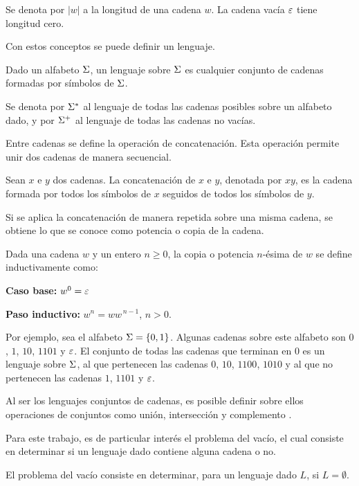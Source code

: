 Se denota por $|w|$ a la longitud de una cadena $w$. La cadena vacía $\varepsilon$ tiene longitud cero.

Con estos conceptos se puede definir un lenguaje.

\begin{definition}
	Dado un alfabeto $\Sigma$, un lenguaje sobre $\Sigma$ es cualquier conjunto de cadenas formadas por símbolos de $\Sigma$.
\end{definition}

Se denota por $\Sigma^*$ al lenguaje de todas las cadenas posibles sobre un alfabeto dado, y por $\Sigma^+$ al lenguaje de todas las cadenas no vacías.

Entre cadenas se define la operación de concatenación. Esta operación permite unir dos cadenas de manera secuencial.

\begin{definition}
	Sean $x$ e $y$ dos cadenas. La concatenación de $x$ e $y$, denotada por $xy$, es la cadena formada por todos los símbolos de $x$ seguidos de todos los símbolos de $y$.
\end{definition}

Si se aplica la concatenación de manera repetida sobre una misma cadena, se obtiene lo que se conoce como potencia o copia de la cadena.

\begin{definition}
	Dada una cadena $w$ y un entero $n \geq 0$, la copia o potencia $n$-ésima de $w$ se define inductivamente como:

	\textbf{Caso base:} $w^0 = \varepsilon$

	\textbf{Paso inductivo:} $w^n = w w^{\,n-1}$, $n > 0$.
\end{definition}

Por ejemplo, sea el alfabeto $\Sigma = \{0, 1\}$. Algunas cadenas sobre este alfabeto son $0$, $1$, $10$, $1101$ y $\varepsilon$. El conjunto de todas las cadenas que terminan en $0$ es un lenguaje sobre $\Sigma$, al que pertenecen las cadenas $0$, $10$, $1100$, $1010$ y al que no pertenecen las cadenas $1$, $1101$ y $\varepsilon$.

Al ser los lenguajes conjuntos de cadenas, es posible definir sobre ellos operaciones de conjuntos como unión, intersección y complemento \cite{automataTheory}.

Para este trabajo, es de particular interés el \lquoti problema del vacío\rquoti, el cual consiste en determinar si un lenguaje dado contiene alguna cadena o no.
\begin{definition}
	El problema del vacío consiste en determinar, para un lenguaje dado $L$, si $L = \emptyset$.
\end{definition}

